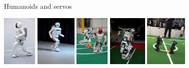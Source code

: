 \documentclass[compress]{beamer}
\begin{document}
\begin{frame}{Humanoids and servos}
{    \begin{center}
        \includegraphics[height=2.5cm]{image19}
        \hspace{0.5em}
        \includegraphics[height=2.5cm]{image10}
        \hspace{0.5em}
        \includegraphics[height=2.5cm]{image21}
        \hspace{0.5em}
        \includegraphics[height=2.5cm]{image22}
        \hspace{0.5em}
        \includegraphics[height=2.5cm]{image23}
    \end{center}
}
\end{frame}
\end{document}
